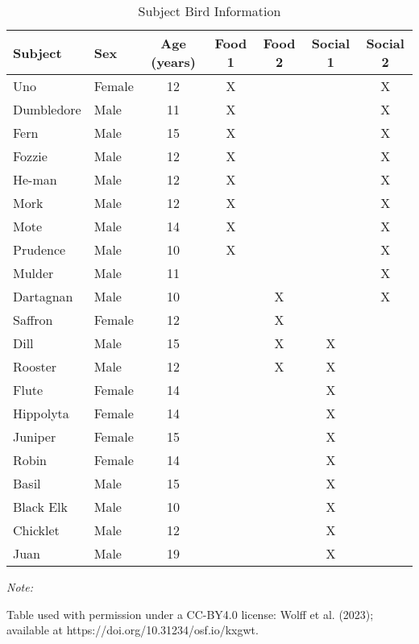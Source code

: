 \documentclass[
  ,pub,floatsintext]{apa6}
\begin{document}
\begin{table}[!h]

\caption{\label{tab:subjectinfotablelatex}Subject Bird Information}
\centering
\begin{threeparttable}
\begin{tabular}[t]{llccccc}
\toprule
Subject & Sex & Age (years) & Food 1 & Food 2 & Social 1 & Social 2\\
\midrule
Uno & Female & 12 & X &  &  & X\\
Dumbledore & Male & 11 & X &  &  & X\\
Fern & Male & 15 & X &  &  & X\\
Fozzie & Male & 12 & X &  &  & X\\
He-man & Male & 12 & X &  &  & X\\
Mork & Male & 12 & X &  &  & X\\
Mote & Male & 14 & X &  &  & X\\
Prudence & Male & 10 & X &  &  & X\\
Mulder & Male & 11 &  &  &  & X\\
Dartagnan & Male & 10 &  & X &  & X\\
Saffron & Female & 12 &  & X &  & \\
Dill & Male & 15 &  & X & X & \\
Rooster & Male & 12 &  & X & X & \\
Flute & Female & 14 &  &  & X & \\
Hippolyta & Female & 14 &  &  & X & \\
Juniper & Female & 15 &  &  & X & \\
Robin & Female & 14 &  &  & X & \\
Basil & Male & 15 &  &  & X & \\
Black Elk & Male & 10 &  &  & X & \\
Chicklet & Male & 12 &  &  & X & \\
Juan & Male & 19 &  &  & X & \\
\bottomrule
\end{tabular}
\begin{tablenotes}
\item \textit{Note: } 
\item Table used with permission under a CC-BY4.0 license: Wolff et al. (2023); available at https://doi.org/10.31234/osf.io/kxgwt.
\end{tablenotes}
\end{threeparttable}
\end{table}
\end{document}

